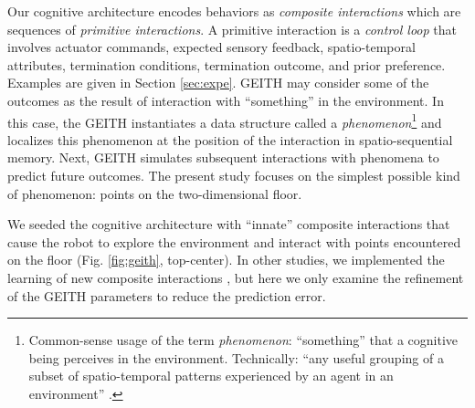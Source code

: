 \documentclass[runningheads]{llncs}
\begin{document}
Our cognitive architecture encodes behaviors as \textit{composite interactions} which are sequences of \textit{primitive interactions}.
A primitive interaction is a \textit{control loop} that involves actuator commands, expected sensory feedback, spatio-temporal attributes, termination conditions, termination outcome, and prior preference. 
Examples are given in Section \ref{sec:expe}. 
 GEITH may consider some of the outcomes as the result of interaction with ``something'' in the environment.
In this case, the GEITH instantiates a data structure called a \textit{phenomenon}\footnote{Common-sense usage of the term \textit{phenomenon}: ``something'' that a cognitive being perceives in the environment. Technically: ``any useful grouping of a subset of spatio-temporal patterns experienced by an agent in an environment'' \cite[p. 8]{thorisson_explanation_2021}.} and localizes this phenomenon at the position of the interaction in spatio-sequential memory.
Next, GEITH simulates subsequent interactions with phenomena to predict future outcomes. 
The present study focuses on the simplest possible kind of phenomenon: points on the two-dimensional floor.

We seeded the cognitive architecture with ``innate'' composite interactions that cause the robot to explore the environment and interact with points encountered on the floor (Fig. \ref{fig:geith}, top-center). 
In other studies, we implemented the learning of new composite interactions \cite{georgeon_cash_2019}, but here we only examine the refinement of the GEITH parameters to reduce the prediction error.
\end{document}
